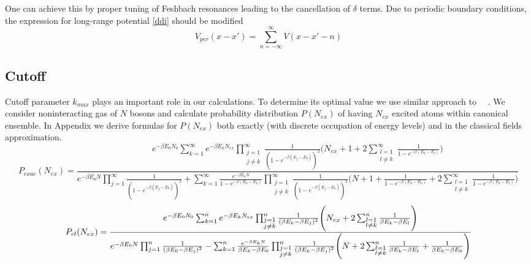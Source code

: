 \documentclass[aps,pra,reprint]{revtex4-2}
\begin{document}
    One can achieve this by proper tuning of Feshbach resonances leading to the cancellation of $\delta$ terms.
     Due to periodic boundary conditions, the expression for long-range potential \ref{ddi} should be modified 
     \begin{equation}
         V_{per}(x-x')=\sum_{n=-\infty}^{\infty} V(x-x'-n)
     \end{equation}
     \subsection{Cutoff}
    Cutoff parameter $k_{max}$ plays an important role in our calculations. To determine its optimal value we use similar approach to ~\cite{witkowska2009bose}~\cite{witkowska2010monte}. We consider noninteracting gas of $N$
    bosons and calculate probability distribution $P(N_{ex})$  of having $N_{ex}$ excited atoms within canonical ensemble. In Appendix we derive formulas for $P({N_{ex}})$ both exactly (with discrete occupation of energy levels) and in the classical fields approximation.
    \begin{equation*}
        P_{exac}(N_{ex})=\frac{e^{-\beta E_0 N_0}\sum_{k=1}^{\infty} e^{-\beta E_k N_{ex}} \prod_{\substack{j=1\\j \neq k}}^{\infty} \frac{1}{(1-e^{-\beta(E_j-E_k)})^2}\Bigg(N_{ex}+1 + 2\sum_{\substack{l=1\\l \neq k}}^{\infty} \frac{1}{1-e^{-\beta(E_k-E_l)}} \Bigg)}{e^{-\beta E_0 N} \prod _{j=1}^{\infty} \frac{1}{(1-e^{-\beta(E_j-E_0)})^2}+\sum_{k=1}^{\infty}\frac{e^{-\beta E_k N}}{1-e^{-\beta(E_0-E_k)}}\prod_{\substack{j=1\\j \neq k}}^{\infty} \frac{1}{(1-e^{-\beta(E_j-E_k)})^2} \Bigg( N+1 +\frac{1}{1-e^{-\beta (E_k-E_0)}}+2\sum_{\substack{l=1\\l \neq k}}^{\infty} \frac{1}{1-e^{-\beta(E_k-E_l)}} \Bigg)}
    \end{equation*}
     \begin{equation*}
        P_{cl}(N_{ex})=\frac{e^{-\beta E_0 N_0}\sum_{k=1}^n e^{-\beta E_k N_{ex}} \prod_{\substack{j=1\\j \neq k}}^n \frac{1}{(\beta E_k -\beta E_j)^2} \Bigg(N_{ex}+2\sum_{\substack{l=1\\l \neq k}}^n \frac{1}{\beta E_k-\beta E_l}\Bigg)}{e^{-\beta E_0 N} \prod_{j=1}^n \frac{1}{(\beta E_0 -\beta E_j)^2}\\-\sum_{k=1}^n  \frac{e^{-\beta E_k N}}{\beta E_k- \beta E_0} \prod_{\substack{j=1\\j \neq k}}^n \frac{1}{(\beta E_k -\beta E_j)^2}\Bigg(N+2\sum_{\substack{l=1\\l \neq k}}^n \frac{1}{\beta E_k-\beta E_l}+ \frac{1}{\beta E_k -\beta E_0}\Bigg) }
    \end{equation*}
\end{document}
